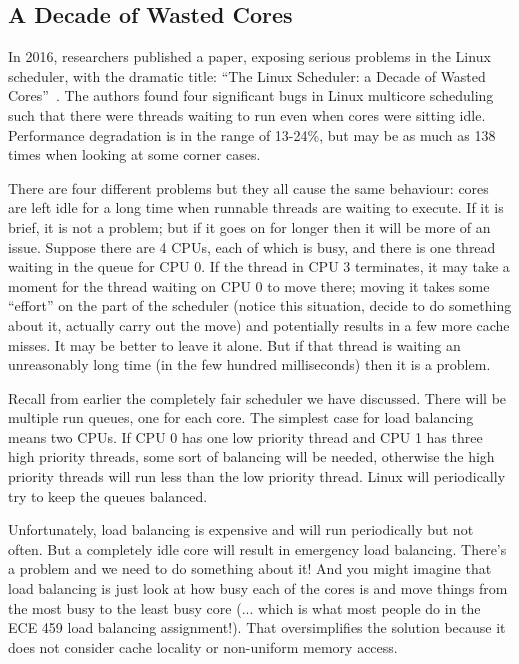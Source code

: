 \subsection*{A Decade of Wasted Cores}

In 2016, researchers published a paper, exposing serious problems in the Linux scheduler, with the dramatic title: ``The Linux Scheduler: a Decade of Wasted Cores''~\cite{wastedcores}. The authors found four significant bugs in Linux multicore scheduling such that there were threads waiting to run even when cores were sitting idle. Performance degradation is in the range of 13-24\%, but may be as much as 138 times when looking at some corner cases. 

There are four different problems but they all cause the same behaviour: cores are left idle for a long time when runnable threads are waiting to execute. If it is brief, it is not a problem; but if it goes on for longer then it will be more of an issue. Suppose there are 4 CPUs, each of which is busy, and there is one thread waiting in the queue for CPU 0. If the thread in CPU 3 terminates, it may take a moment for the thread waiting on CPU 0 to move there; moving it takes some ``effort'' on the part of the scheduler (notice this situation, decide to do something about it, actually carry out the move) and potentially results in a few more cache misses. It may be better to leave it alone. But if that thread is waiting an unreasonably long time (in the few hundred milliseconds) then it is a problem.

Recall from earlier the completely fair scheduler we have discussed. There will be multiple run queues, one for each core. The simplest case for load balancing means two CPUs. If CPU 0 has one low priority thread and CPU 1 has three high priority threads, some sort of balancing will be needed, otherwise the high priority threads will run less than the low priority thread. Linux will periodically try to keep the queues balanced.

Unfortunately, load balancing is expensive and will run periodically but not often. But a completely idle core will result in emergency load balancing. There's a problem and we need to do something about it! And you might imagine that load balancing is just look at how busy each of the cores is and move things from the most busy to the least busy core (... which is what most people do in the ECE 459 load balancing assignment!). That oversimplifies the solution because it does not consider cache locality or non-uniform memory access.

